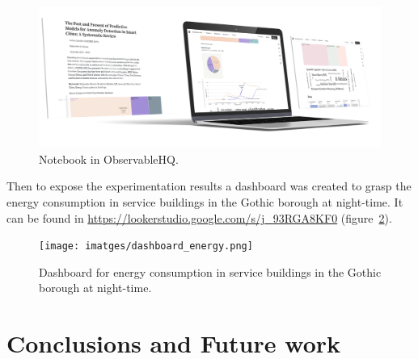 \documentclass[a4paper,12pt,twoside]{ThesisStyle}
\begin{document}
\begin{figure}[hbt]
\centering
\includegraphics[width=13 cm]{imatges/observable_notebook.png}
\caption{\label{fig:ObservableHQ} Notebook in ObservableHQ.}
\end{figure}

Then to expose the experimentation results a dashboard was created to grasp the energy consumption in service buildings in the Gothic borough at night-time. It can be found in \url{https://lookerstudio.google.com/s/j_93RGA8KF0} (figure~\ref{fig:dashboard}).

\begin{figure}[hbt]
\centering
\texttt{[image: imatges/dashboard\_energy.png]}
\caption{\label{fig:dashboard} Dashboard for energy consumption in service buildings in the Gothic borough at night-time.}
\end{figure}


\chapter{Conclusions and Future work}
\label{cap:concl}
\end{document}
